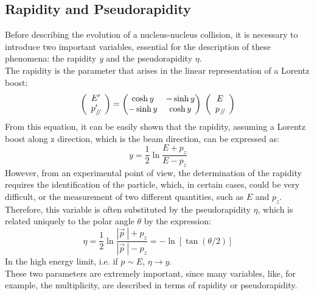 \subsection{Rapidity and Pseudorapidity}
Before describing the evolution of a nucleus-nucleus collision, it is necessary to introduce two important variables, essential for the description of these phenomena: the rapidity \textit{y} and the pseudorapidity $\eta$.\\
The rapidity is the parameter that arises in the linear representation of a Lorentz boost:
\begin{equation}
 \left(
    \begin{array}{c}
      E'\\
      p'_{\:\mathbin{\!/\mkern-4mu/\!}}
    \end{array}
  \right) = 
      \begin{pmatrix}
      \cosh y & -\sinh y \\
      -\sinh y & \cosh y 
    \end{pmatrix}
  \;
  \left(
     \begin{array}{c}
      E\\
      p_{\:\mathbin{\!/\mkern-4mu/\!}}
    \end{array}
  \right)
\end{equation}
%
From this equation, it can be easily shown that the rapidity, assuming a Lorentz boost along z direction, which is the beam direction, can be expressed as:
\begin{equation}
 y = \frac{1}{2}\ln\frac{E + p_{z}}{E - p_{z}}
\end{equation}
However, from an experimental point of view, the determination of the rapidity requires the identification of the particle, which, in certain cases, could be very difficult, or the measurement of two different quantities, such as $E$ and $p_{z}$. Therefore, this variable is often substituted by the pseudorapidity $\eta$, which is related uniquely to the polar angle $\theta$ by the expression:
\begin{equation}
 \eta = \frac{1}{2}\ln\frac{|\vec{p}\:| + p_{z}}{|\vec{p}\:| - p_{z}} = - \ln [\tan (\theta/2)]
\end{equation}
In the high energy limit, i.e. if $p \sim E$, $\eta \longrightarrow y$.\\
These two parameters are extremely important, since many variables, like, for example, the multiplicity, are described in terms of rapidity or pseudorapidity.\\
%
